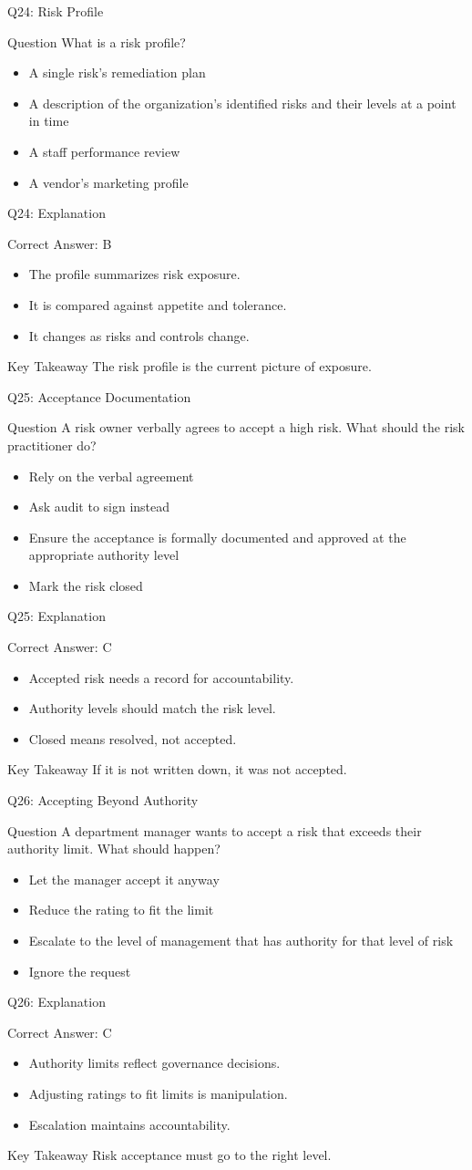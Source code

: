 \documentclass[aspectratio=169]{beamer}
\newcommand{\hq}[7]{%
	\begin{frame}{Q#1: #2}
		\begin{block}{Question}
			#3
		\end{block}
		\begin{itemize}
			#4
		\end{itemize}
	\end{frame}
	\begin{frame}{Q#1: Explanation}
		\begin{block}{Correct Answer: #5}
			\begin{itemize}
				#6
			\end{itemize}
		\end{block}
		\begin{alertblock}{Key Takeaway}
			#7
		\end{alertblock}
	\end{frame}
}
\begin{document}
	\hq{24}{Risk Profile}
	{What is a risk profile?}
	{\item[\textbf{(A)}] A single risk's remediation plan
		\item[\textbf{(B)}] A description of the organization's identified risks and their levels at a point in time
		\item[\textbf{(C)}] A staff performance review
		\item[\textbf{(D)}] A vendor's marketing profile}
	{B}
	{\item The profile summarizes risk exposure.
		\item It is compared against appetite and tolerance.
		\item It changes as risks and controls change.}
	{The risk profile is the current picture of exposure.}
	
	\hq{25}{Acceptance Documentation}
	{A risk owner verbally agrees to accept a high risk. What should the risk practitioner do?}
	{\item[\textbf{(A)}] Rely on the verbal agreement
		\item[\textbf{(B)}] Ask audit to sign instead
		\item[\textbf{(C)}] Ensure the acceptance is formally documented and approved at the appropriate authority level
		\item[\textbf{(D)}] Mark the risk closed}
	{C}
	{\item Accepted risk needs a record for accountability.
		\item Authority levels should match the risk level.
		\item Closed means resolved, not accepted.}
	{If it is not written down, it was not accepted.}
	
	\hq{26}{Accepting Beyond Authority}
	{A department manager wants to accept a risk that exceeds their authority limit. What should happen?}
	{\item[\textbf{(A)}] Let the manager accept it anyway
		\item[\textbf{(B)}] Reduce the rating to fit the limit
		\item[\textbf{(C)}] Escalate to the level of management that has authority for that level of risk
		\item[\textbf{(D)}] Ignore the request}
	{C}
	{\item Authority limits reflect governance decisions.
		\item Adjusting ratings to fit limits is manipulation.
		\item Escalation maintains accountability.}
	{Risk acceptance must go to the right level.}
	
\end{document}
